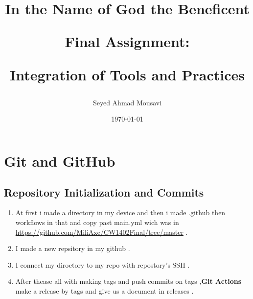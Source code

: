 \documentclass{article}
\begin{document}
\begin{titlepage}
\title{
\textbf{In the Name of God the Beneficent}\par
    \vspace{2in}

\textbf{Final Assignment:}\par

\textbf{Integration of Tools and Practices}\par
    \vspace{2in}
}
\author{Seyed Ahmad Mousavi}

\date{\today}
\maketitle
\thispagestyle{empty}
\end{titlepage}
\newpage

\tableofcontents

\fancyfoot[C]{}
\newpage
\section{Git and GitHub}
\subsection{Repository Initialization and Commits}
\begin{enumerate}
    \item {At first i made a directory in my device and then i made .github then workflows in that and copy past main.yml wich was in \url{https://github.com/MiliAxe/CW1402Final/tree/master} .}
    \item {I made a new repsitory in my github .}
    \item {I connect my diroctory to my repo with repostory's SSH .}
    \item {After thease all with making tags and push commits on tags ,\textbf{Git Actions} make a release by tags and give us a document in releases .}
\end{enumerate}
\end{document}
